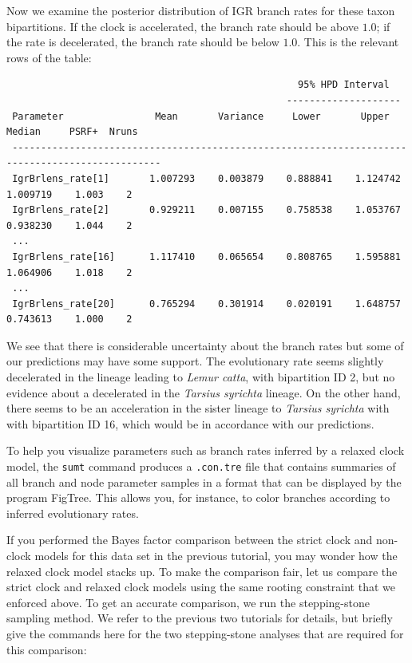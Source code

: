 \documentclass[12pt]{book}
\newcommand{\ttt}[1]{\texttt{#1}}
\begin{document}
Now we examine the posterior distribution of IGR branch rates for these taxon bipartitions. If the
clock is accelerated, the branch rate should be above $1.0$; if the rate is decelerated, the branch
rate should be below $1.0$. This is the relevant rows of the table:

\scriptsize
\begin{singlespacing}
\begin{verbatim}
                                                   95% HPD Interval
                                                 --------------------
 Parameter                Mean       Variance     Lower       Upper       Median     PSRF+  Nruns
 ------------------------------------------------------------------------------------------------
 IgrBrlens_rate[1]       1.007293    0.003879    0.888841    1.124742    1.009719    1.003    2
 IgrBrlens_rate[2]       0.929211    0.007155    0.758538    1.053767    0.938230    1.044    2
 ...
 IgrBrlens_rate[16]      1.117410    0.065654    0.808765    1.595881    1.064906    1.018    2
 ...
 IgrBrlens_rate[20]      0.765294    0.301914    0.020191    1.648757    0.743613    1.000    2

\end{verbatim}
\end{singlespacing}
\normalsize

We see that there is considerable uncertainty about the branch rates but some of our predictions
may have some support. The evolutionary rate seems slightly decelerated in the lineage leading to
\textit{Lemur catta}, with bipartition ID 2, but no evidence about a decelerated in the
\textit{Tarsius syrichta} lineage. On the other hand, there seems to be an acceleration in the
sister lineage to \textit{Tarsius syrichta} with with bipartition ID 16, which would be in
accordance with our predictions.

To help you visualize parameters such as branch rates inferred by a relaxed clock model, the
\ttt{sumt} command produces a \ttt{.con.tre} file that contains summaries of all branch and node
parameter samples in a format that can be displayed by the program FigTree. This allows you, for
instance, to color branches according to inferred evolutionary rates.

If you performed the Bayes factor comparison between the strict clock and non-clock models for this
data set in the previous tutorial, you may wonder how the relaxed clock model stacks up. To make
the comparison fair, let us compare the strict clock and relaxed clock models using the same
rooting constraint that we enforced above. To get an accurate comparison, we run the stepping-stone
sampling method. We refer to the previous two tutorials for details, but briefly give the commands
here for the two stepping-stone analyses that are required for this comparison:
\end{document}
